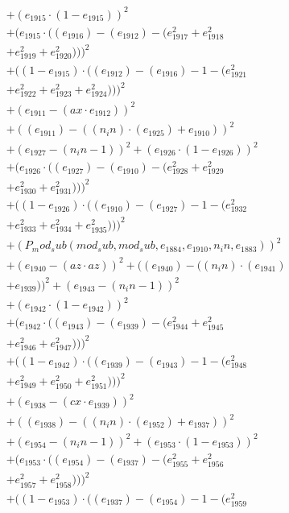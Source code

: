 \documentclass[10pt, a4paper]{article}
\begin{document}
\begin{small}
\begin{align*}
& + (e_{1915}  \cdot  (1 - e_{1915}))^{2} \\
& + (e_{1915}  \cdot  ((e_{1916}) - (e_{1912}) - (e_{1917}^{2} + e_{1918}^{2} \\
& + e_{1919}^{2} + e_{1920}^{2})))^{2} \\
& + ((1 - e_{1915})  \cdot  ((e_{1912}) - (e_{1916}) - 1 - (e_{1921}^{2} \\
& + e_{1922}^{2} + e_{1923}^{2} + e_{1924}^{2})))^{2} \\
& + (e_{1911} - (ax  \cdot  e_{1912}))^{2} \\
& + ((e_{1911}) - ((n_in)  \cdot  (e_{1925}) + e_{1910}))^{2} \\
& + (e_{1927} - (n_in - 1))^{2} + (e_{1926}  \cdot  (1 - e_{1926}))^{2} \\
& + (e_{1926}  \cdot  ((e_{1927}) - (e_{1910}) - (e_{1928}^{2} + e_{1929}^{2} \\
& + e_{1930}^{2} + e_{1931}^{2})))^{2} \\
& + ((1 - e_{1926})  \cdot  ((e_{1910}) - (e_{1927}) - 1 - (e_{1932}^{2} \\
& + e_{1933}^{2} + e_{1934}^{2} + e_{1935}^{2})))^{2} \\
& + (P_mod_sub(mod_sub, mod_sub, e_{1884}, e_{1910}, n_in, e_{1883}))^{2} \\
& + (e_{1940} - (az  \cdot  az))^{2} + ((e_{1940}) - ((n_in)  \cdot  (e_{1941}) \\
& + e_{1939}))^{2} + (e_{1943} - (n_in - 1))^{2} \\
& + (e_{1942}  \cdot  (1 - e_{1942}))^{2} \\
& + (e_{1942}  \cdot  ((e_{1943}) - (e_{1939}) - (e_{1944}^{2} + e_{1945}^{2} \\
& + e_{1946}^{2} + e_{1947}^{2})))^{2} \\
& + ((1 - e_{1942})  \cdot  ((e_{1939}) - (e_{1943}) - 1 - (e_{1948}^{2} \\
& + e_{1949}^{2} + e_{1950}^{2} + e_{1951}^{2})))^{2} \\
& + (e_{1938} - (cx  \cdot  e_{1939}))^{2} \\
& + ((e_{1938}) - ((n_in)  \cdot  (e_{1952}) + e_{1937}))^{2} \\
& + (e_{1954} - (n_in - 1))^{2} + (e_{1953}  \cdot  (1 - e_{1953}))^{2} \\
& + (e_{1953}  \cdot  ((e_{1954}) - (e_{1937}) - (e_{1955}^{2} + e_{1956}^{2} \\
& + e_{1957}^{2} + e_{1958}^{2})))^{2} \\
& + ((1 - e_{1953})  \cdot  ((e_{1937}) - (e_{1954}) - 1 - (e_{1959}^{2} \\

\end{align*}
\end{small}
\end{document}

